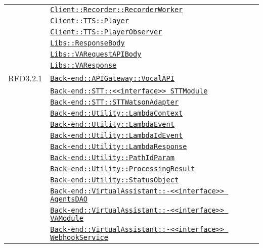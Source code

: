 \begin{longtable}{|>{\centering}m{3cm}|m{10cm}<{\centering}|}
& \hyperref[Client::Recorder::RecorderWorker]{\texttt{Client::Recorder::RecorderWorker}}\\
& \hyperref[Client::TTS::Player]{\texttt{Client::TTS::Player}}\\
& \hyperref[Client::TTS::PlayerObserver]{\texttt{Client::TTS::PlayerObserver}}\\
& \hyperref[Libs::ResponseBody]{\texttt{Libs::ResponseBody}}\\
& \hyperref[Libs::VARequestAPIBody]{\texttt{Libs::VARequestAPIBody}}\\
& \hyperref[Libs::VAResponse]{\texttt{Libs::VAResponse}}\\ \hline

RFD3.2.1 & \hyperref[Back-end::APIGateway::VocalAPI]{\texttt{Back-end::APIGateway::VocalAPI}}\\
& \hyperref[Back-end::STT::<<interface>> STTModule]{\texttt{Back-end::STT::<<interface>> STTModule}}\\
& \hyperref[Back-end::STT::STTWatsonAdapter]{\texttt{Back-end::STT::STTWatsonAdapter}}\\
& \hyperref[Back-end::Utility::LambdaContext]{\texttt{Back-end::Utility::LambdaContext}}\\
& \hyperref[Back-end::Utility::LambdaEvent]{\texttt{Back-end::Utility::LambdaEvent}}\\
& \hyperref[Back-end::Utility::LambdaIdEvent]{\texttt{Back-end::Utility::LambdaIdEvent}}\\
& \hyperref[Back-end::Utility::LambdaResponse]{\texttt{Back-end::Utility::LambdaResponse}}\\
& \hyperref[Back-end::Utility::PathIdParam]{\texttt{Back-end::Utility::PathIdParam}}\\
& \hyperref[Back-end::Utility::ProcessingResult]{\texttt{Back-end::Utility::ProcessingResult}}\\
& \hyperref[Back-end::Utility::StatusObject]{\texttt{Back-end::Utility::StatusObject}}\\
& \hyperref[Back-end::VirtualAssistant::<<interface>> AgentsDAO]{\texttt{Back-end::VirtualAssistant::-\linebreak <<interface>> AgentsDAO}}\\
& \hyperref[Back-end::VirtualAssistant::<<interface>> VAModule]{\texttt{Back-end::VirtualAssistant::-\linebreak <<interface>> VAModule}}\\
& \hyperref[Back-end::VirtualAssistant::<<interface>> WebhookService]{\texttt{Back-end::VirtualAssistant::-\linebreak <<interface>> WebhookService}}\\

\end{longtable}
